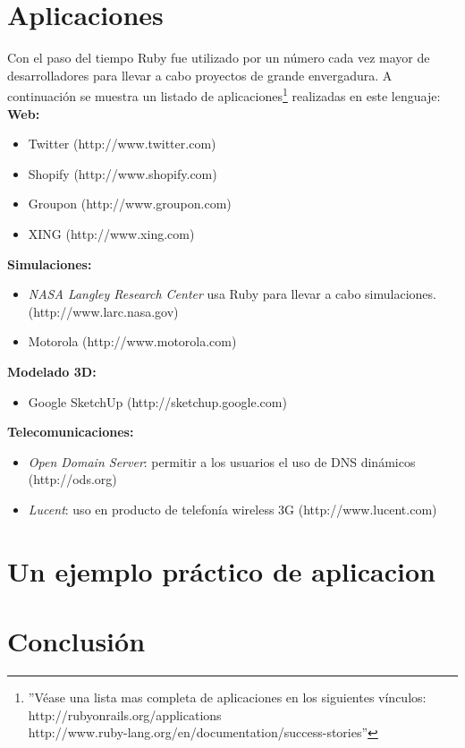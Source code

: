 \documentclass{article}
\begin{document}
\section{Aplicaciones}

Con el paso del tiempo Ruby fue utilizado por un número cada vez mayor de desarrolladores para llevar a cabo proyectos de grande envergadura. A continuación se muestra un listado de aplicaciones\footnote{''Véase una lista mas completa de aplicaciones en los siguientes vínculos: http://rubyonrails.org/applications\\http://www.ruby-lang.org/en/documentation/success-stories''} realizadas en este lenguaje:
\bigskip\\

\textbf{Web:}
\begin{itemize}
	\itemsep=1pt \topsep=0pt \partopsep=0pt \parskip=0pt \parsep=0pt
	\item Twitter (http://www.twitter.com)
	\item Shopify (http://www.shopify.com)
	\item Groupon (http://www.groupon.com)
	\item XING (http://www.xing.com)
\end{itemize}
\medskip

\textbf{Simulaciones:}
\begin{itemize}
	\itemsep=1pt \topsep=0pt \partopsep=0pt \parskip=0pt \parsep=0pt
	\item \textit{NASA Langley Research Center} usa Ruby para llevar a cabo simulaciones. (http://www.larc.nasa.gov)
	\item Motorola (http://www.motorola.com)
\end{itemize}
\medskip

\textbf{Modelado 3D:}
\begin{itemize}
	\itemsep=1pt \topsep=0pt \partopsep=0pt \parskip=0pt \parsep=0pt
	\item Google SketchUp (http://sketchup.google.com)
\end{itemize}
\medskip

\textbf{Telecomunicaciones:}
\begin{itemize}
	\itemsep=1pt \topsep=0pt \partopsep=0pt \parskip=0pt \parsep=0pt
	\item \textit{Open Domain Server}: permitir a los usuarios el uso de DNS dinámicos (http://ods.org)
	\item \textit{Lucent}: uso en producto de telefonía wireless 3G (http://www.lucent.com)
\end{itemize}
\medskip




\section{Un ejemplo práctico de aplicacion}





\section{Conclusión}
\end{document}
